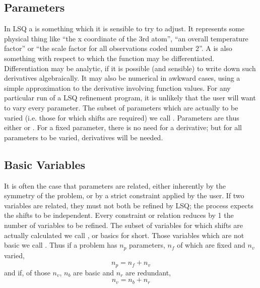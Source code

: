 \subsection{Parameters}
In LSQ a  is something which it is sensible to try to
adjust. It represents some physical thing like ``the x coordinate of the 3rd
atom'', ``an overall temperature factor'' or ``the scale factor for all
observations coded number 2''.
\p 
A  is also something with respect to which the function may be
differentiated.  Differentiation may be analytic, if it is possible (and
sensible) to write down such derivatives algebraically.  It may also be
numerical in awkward cases, using a simple approximation to the
derivative involving function values.
\p 
For any particular run of a LSQ refinement program, it is unlikely that
the user will want to vary every parameter.  The subset of parameters
which are actually to be varied (i.e. those for which shifts are
required) we call .
\p 
Parameters are thus either  or .
For a fixed parameter,
there is no need for a derivative; but for all parameters to be
varied, derivatives will be needed.
% 
\subsection{Basic Variables}
% 
It is often the case that parameters are related, either inherently by
the symmetry of the problem, or by a strict constraint applied by the user.  If
two variables are related, they must not both be refined by LSQ;  the
process expects the shifts to be independent.  Every constraint or
relation reduces by 1 the number of variables to be refined.
\p 
The subset of variables for which shifts are actually calculated
we call , or basics for short.
\p 
Those variables which are not basic we call . 
Thus if a problem has $n_p$ parameters, $n_f$ of 
which are fixed and $n_v$ varied,
               $$n_p = n_f + n_v$$
and if, of those $n_v$, $n_b$ are basic and $n_r$ are redundant,
              $$n_v = n_b + n_r$$
% 
